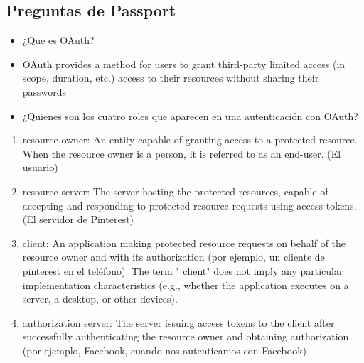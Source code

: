 \subsection{Preguntas de Passport}\label{preguntas-de-passport}

\begin{itemize}
\itemsep1pt\parskip0pt
\item
  ¿Que es OAuth?
\item
  OAuth provides a method for users to grant third-party limited access
  (in scope, duration, etc.) access to their resources without sharing
  their passwords
\item
  ¿Quienes son los cuatro roles que aparecen en una autenticación con
  OAuth?
\end{itemize}

\begin{enumerate}
\def\labelenumi{\arabic{enumi}.}
\itemsep1pt\parskip0pt
\item
  resource owner: An entity capable of granting access to a protected
  resource. When the resource owner is a person, it is referred to as an
  end-user. (El usuario)
\item
  resource server: The server hosting the protected resources, capable
  of accepting and responding to protected resource requests using
  access tokens. (El servidor de Pinterest)
\item
  client: An application making protected resource requests on behalf of
  the resource owner and with its authorization (por ejemplo, un cliente
  de pinterest en el teléfono). The term " client" does not imply any
  particular implementation characteristics (e.g., whether the
  application executes on a server, a desktop, or other devices).
\item
  authorization server: The server issuing access tokens to the client
  after successfully authenticating the resource owner and obtaining
  authorization (por ejemplo, Facebook, cuando nos autenticamos con
  Facebook)
\end{enumerate}


